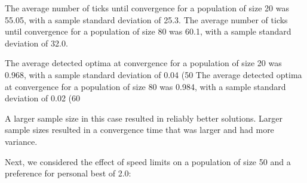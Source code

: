 \documentclass[12pt]{article}
\begin{document}
The average number of ticks until convergence for a population of size 20 was 55.05, with a sample standard deviation of 25.3.
The average number of ticks until convergence for a population of size 80 was 60.1, with a sample standard deviation of 32.0.

The average detected optima at convergence for a population of size 20 was 0.968, with a sample standard deviation of 0.04 (50%
The average detected optima at convergence for a population of size 80 was 0.984, with a sample standard deviation of 0.02 (60%

A larger sample size in this case resulted in reliably better solutions.
Larger sample sizes resulted in a convergence time that was larger and had more variance.

Next, we considered the effect of speed limits on a population of size 50 and a preference for personal best of 2.0:
\end{document}
